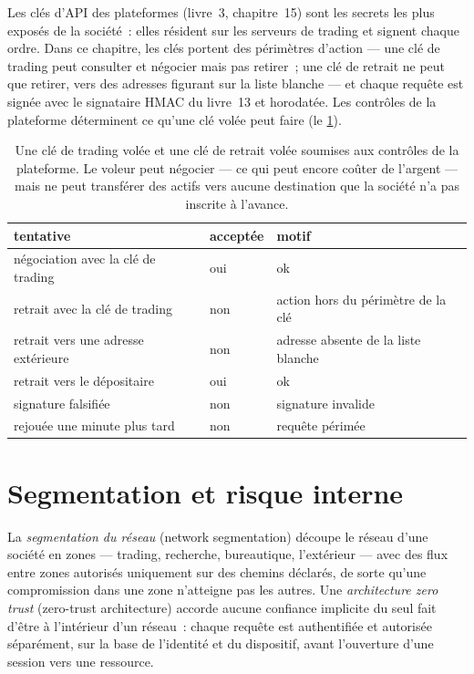 Les clés d'API des plateformes (livre~3, chapitre~15) sont les secrets les plus exposés de la société~: elles résident sur les serveurs de trading et signent chaque ordre. Dans ce chapitre, les
clés portent des périmètres d'action --- une clé de trading peut consulter et négocier mais pas retirer~; une clé de retrait ne peut que retirer, vers des adresses figurant sur la liste blanche --- et
chaque requête est signée avec le signataire HMAC du livre~13 et horodatée. Les contrôles de la plateforme déterminent ce qu'une clé volée peut faire
(le \cref{tab:pl:security:keys}).

\label{lst:pl:security:verify}

\begin{table}[htbp]
\centering\small
\begin{tabular}{lll}
\toprule
tentative & acceptée & motif\\
\midrule
négociation avec la clé de trading & oui & ok\\
retrait avec la clé de trading & non & action hors du périmètre de la clé\\
retrait vers une adresse extérieure & non & adresse absente de la liste blanche\\
retrait vers le dépositaire & oui & ok\\
signature falsifiée & non & signature invalide\\
rejouée une minute plus tard & non & requête périmée\\
\bottomrule
\end{tabular}
\caption{Une clé de trading volée et une clé de retrait volée soumises aux contrôles de la plateforme. Le voleur peut négocier --- ce qui peut encore coûter de l'argent
--- mais ne peut transférer des actifs vers aucune destination que la société n'a pas inscrite à l'avance.}\label{tab:pl:security:keys}
\end{table}

\section{Segmentation et risque interne}

\begin{definition}\label{def:pl:security:segmentation}
La \emph{segmentation du réseau} (network segmentation) découpe le réseau d'une société en zones --- trading, recherche, bureautique, l'extérieur ---
avec des flux entre zones autorisés uniquement sur des chemins déclarés, de sorte qu'une compromission dans une zone n'atteigne pas les autres. Une \emph{architecture
zero trust} (zero-trust architecture) accorde aucune confiance implicite du seul fait d'être à l'intérieur d'un réseau~: chaque requête est authentifiée et
autorisée séparément, sur la base de l'identité et du dispositif, avant l'ouverture d'une session vers une ressource.
\end{definition}

